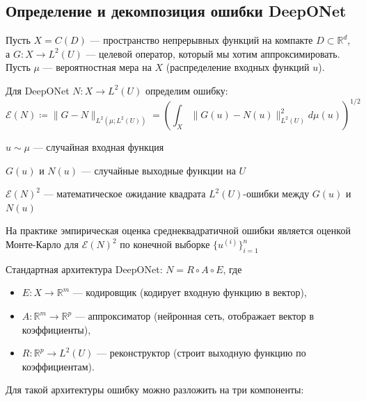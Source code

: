 \documentclass[../NDCNNAI_main.tex]{subfiles}
\begin{document}
\subsection{Определение и декомпозиция ошибки DeepONet}

Пусть \( X = C(D) \) --- пространство непрерывных функций на компакте \( D \subset \mathbb{R}^d \), а \( G \colon X \to L^2(U) \) --- целевой оператор, который мы хотим аппроксимировать. Пусть \( \mu \) --- вероятностная мера на \( X \) (распределение входных функций \( u \)).

\begin{definition}
Для DeepONet \( N \colon X \to L^2(U) \) определим ошибку:
\[
\mathcal{E}(N) \coloneq \|G - N\|_{L^2(\mu; L^2(U))} 
= \left( \int_X \|G(u) - N(u)\|_{L^2(U)}^2 d\mu(u) \right)^{1/2}
\]
\end{definition}

\begin{remark}[1]
    \( u \sim \mu \) --- случайная входная функция
\end{remark}
\begin{remark}[2]
    \( G(u) \) и \( N(u) \) --- случайные выходные функции на \( U \)
\end{remark}
\begin{remark}[3]
    \( \mathcal{E}(N)^2 \) --- математическое ожидание квадрата \( L^2(U) \)-ошибки между \( G(u) \) и \( N(u) \)
\end{remark}
\begin{remark}[4]
    На практике эмпирическая оценка среднеквадратичной ошибки является оценкой Монте-Карло для \( \mathcal{E}(N)^2 \) по конечной выборке \( \{u^{(i)}\}_{i=1}^n \)
\end{remark}

Стандартная архитектура DeepONet: \( N = R \circ A \circ E \), где
\begin{itemize}
    \item \( E \colon X \to \mathbb{R}^m \) --- кодировщик (кодирует входную функцию в вектор),
    \item \( A \colon \mathbb{R}^m \to \mathbb{R}^p \) --- аппроксиматор (нейронная сеть, отображает вектор в коэффициенты),
    \item \( R \colon \mathbb{R}^p \to L^2(U) \) --- реконструктор (строит выходную функцию по коэффициентам).
\end{itemize}

Для такой архитектуры ошибку можно разложить на три компоненты:
\end{document}
